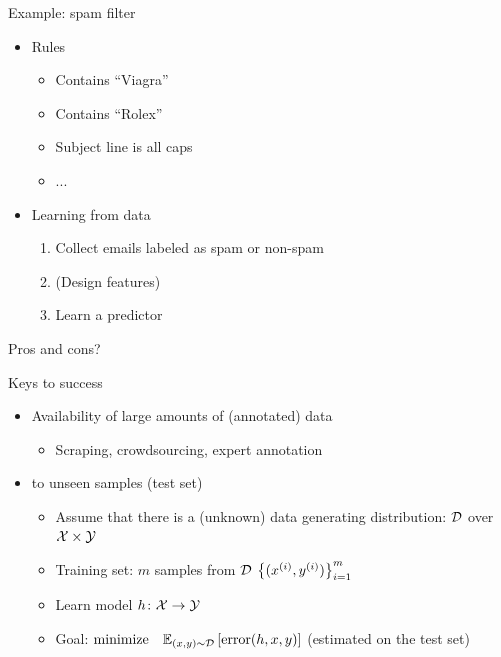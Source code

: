 \documentclass[usenames,dvipsnames,notes,11pt,aspectratio=169]{beamer}
\begin{document}
\begin{frame}
    {Example: spam filter}
    
    \begin{itemize}
        \itemsep1em
        \item Rules
            \begin{itemize}
                \item[] Contains ``Viagra''
                \item[] Contains ``Rolex''
                \item[] Subject line is all caps
                \item[] ... 
            \end{itemize}
        \item Learning from data
            \begin{enumerate}
                \item Collect emails labeled as spam or non-spam 
                \item (Design features) 
                \item Learn a predictor
            \end{enumerate}
    \end{itemize}
    \medskip
    Pros and cons?
\end{frame}

\begin{frame}
    {Keys to success}
    \begin{itemize}
        \itemsep1em
        \item Availability of large amounts of (annotated) data
            \begin{itemize}
                \item[] Scraping, crowdsourcing, expert annotation
            \end{itemize}
        \item {} to unseen samples (test set)
            \begin{itemize}
                \item Assume that there is a (unknown) data generating distribution: $\mathcal{D}$ over $\mathcal{X}\times\mathcal{Y}$
               \item Training set: $m$ samples from $\mathcal{D}$ $\left\{ (x^{(i)}, y^{(i)}) \right\}_{i=1}^m$
               \item Learn model $h\colon \mathcal{X} \rightarrow \mathcal{Y}$
               \item Goal: $\text{minimize}\quad 
                   \mathbb{E}_{(x,y)\sim\mathcal{D}}\left[ \text{error}(h,x,y) \right]$ (estimated on the test set)
            \end{itemize}
    \end{itemize}
\end{frame}
\end{document}

